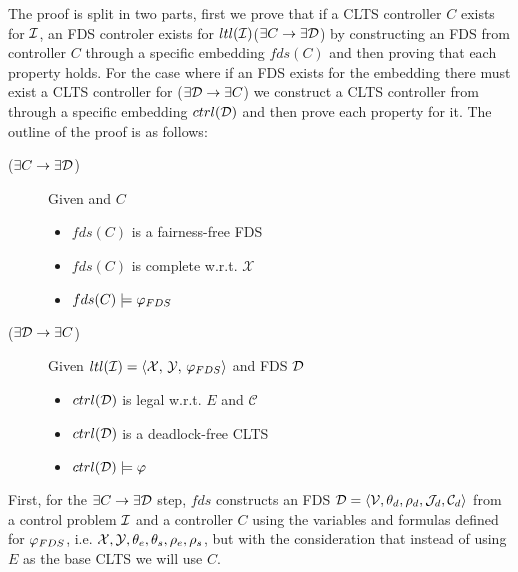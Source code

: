 
The proof is split in two parts, first we prove that if a CLTS controller $C$ exists for $\mathcal{I}$, an FDS controler \fdsD exists for $ltl(\mathcal{I})$($\exists C \rightarrow \exists \mathcal{D}$) by constructing an FDS from controller $C$ through a specific embedding $fds(C)$ and then proving that each property holds. For the case where if an FDS \fdsD exists for the embedding \fdsEmbedding there must exist a CLTS controller for \controlProblem ($\exists \mathcal{D} \rightarrow \exists C$) we construct a CLTS controller from \fdsD through a specific embedding $ctrl(\mathcal{D})$ and then prove each property for it. The outline of the proof is as follows:

\begin{description}
	\item[($\exists C \rightarrow \exists \mathcal{D}$)] Given \controlProblemDef and $C$
		\begin{itemize}
			\item $fds(C)$ is a fairness-free FDS			
			\item $fds(C)$ is complete w.r.t. $\mathcal{X}$
			\item $fds(C) \models \varphi_{FDS}$
		\end{itemize}
	\item[($\exists \mathcal{D} \rightarrow \exists C$)] Given $\fdsEmbeddingDef$ and FDS $\mathcal{D}$
		\begin{itemize}
			\item $ctrl(\mathcal{D})$ is legal w.r.t. $E$ and $\mathcal{C}$
			\item $ctrl(\mathcal{D})$ is a deadlock-free CLTS			
			\item $ctrl(\mathcal{D}) \models \varphi$
		\end{itemize}	
\end{description}

First,  for the $\exists C \rightarrow \exists \mathcal{D}$ step, $fds$ constructs an FDS $\mathcal{D}=\langle \mathcal V, \theta_d, \rho_d, \mathcal{J}_d, \mathcal{C}_d \rangle$ from a control problem $\mathcal{I}$ and a controller $C$ using the variables and formulas defined for $\varphi_{FDS}$, i.e. ${\mathcal{X}}, {\mathcal{Y}}, {\theta_e}, {\theta_s}, {\rho_e}, {\rho_s}$, but with the consideration that instead of using $E$ as the base CLTS we will use $C$.

